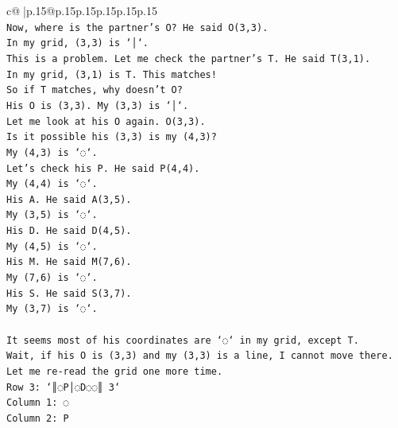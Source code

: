 \documentclass{article}
\begin{document}
{\begin{supertabular}{c@{$\;$}|p{.15\linewidth}@{}p{.15\linewidth}p{.15\linewidth}p{.15\linewidth}p{.15\linewidth}p{.15\linewidth}}
{{{\\ 
\texttt{Now, where is the partner's O? He said O(3,3).} \\
\texttt{In my grid, (3,3) is `│`.} \\
\texttt{This is a problem. Let me check the partner's T. He said T(3,1).} \\
\texttt{In my grid, (3,1) is T. This matches!} \\
\texttt{So if T matches, why doesn't O?} \\
\texttt{His O is (3,3). My (3,3) is `│`.} \\
\texttt{Let me look at his O again. O(3,3).} \\
\texttt{Is it possible his (3,3) is my (4,3)?} \\
\texttt{My (4,3) is `◌`.} \\
\texttt{Let's check his P. He said P(4,4).} \\
\texttt{My (4,4) is `◌`.} \\
\texttt{His A. He said A(3,5).} \\
\texttt{My (3,5) is `◌`.} \\
\texttt{His D. He said D(4,5).} \\
\texttt{My (4,5) is `◌`.} \\
\texttt{His M. He said M(7,6).} \\
\texttt{My (7,6) is `◌`.} \\
\texttt{His S. He said S(3,7).} \\
\texttt{My (3,7) is `◌`.} \\
\\ 
\texttt{It seems most of his coordinates are `◌` in my grid, except T.} \\
\texttt{Wait, if his O is (3,3) and my (3,3) is a line, I cannot move there.} \\
\texttt{Let me re{-}read the grid one more time.} \\
\texttt{Row 3: `║◌P│◌D◌◌║ 3`} \\
\texttt{Column 1: ◌} \\
\texttt{Column 2: P} \\
            }
        }
    }
     \\ \\


\end{supertabular}}
\end{document}
